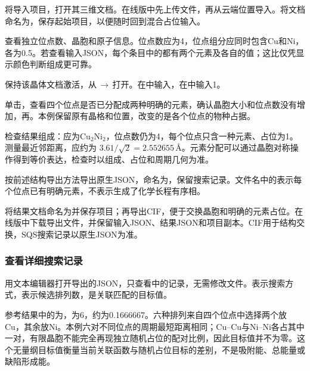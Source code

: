 \begin{steps}
  \item 将导入项目，打开其三维文档。在线版中先上传文件，再从云端位置导入。将文档命名为，保存起始项目，以便随时回到混合占位输入。
  \item 查看独立位点数、晶胞和原子信息。位点数应为4，位点组分应同时包含Cu和Ni，各为0.5。若查看输入JSON，每个条目中的都有两个元素及各自的值；这比仅凭显示颜色判断组成更可靠。
  \item 保持该晶体文档激活，从\,$\rightarrow$\,打开。在中输入，在中输入1。
  \item 单击，查看四个位点是否已分配成两种明确的元素，确认晶胞大小和位点数没有增加，再。本例保留原有晶格和位置，改变的是各个位点的物种占据。
  \item 检查结果组成：应为Cu$_2$Ni$_2$，位点数仍为4，每个位点只含一种元素、占位为1。测量最近邻距离，应约为 $3.61/\sqrt{2}=2.552655\,\text{\AA}$。元素分配可以通过晶胞对称操作得到等价表达，检查时以组成、占位和周期几何为准。
  \item 按前述结构导出方法导出原生JSON，命名为，保留搜索记录。文件名中的表示每个位点已有明确元素，不表示生成了化学长程有序相。
  \item 将结果文档命名为并保存项目；再导出CIF，便于交换晶胞和明确的元素占位。在线版中下载导出文件，并保留输入JSON、结果JSON和项目副本。CIF用于结构交换，SQS搜索记录以原生JSON为准。
\end{steps}

\subsubsection*{查看详细搜索记录}

用文本编辑器打开导出的JSON，只查看中的记录，无需修改文件。表示搜索方式，表示候选排列数，是关联匹配的目标值。

参考结果中的为，为6，约为0.1666667。六种排列来自四个位点中选择两个放Cu，其余放Ni。本例六对不同位点的周期最短距离相同；Cu--Cu与Ni--Ni各占其中一对，有限晶胞不能完全再现独立随机占位的配对比例，因此目标值并不为零。这个无量纲目标值衡量当前关联函数与随机占位目标的差别，不是吸附能、总能量或缺陷形成能。

